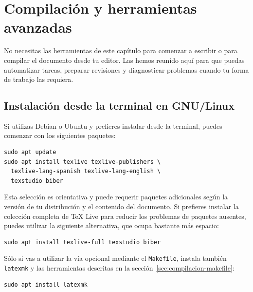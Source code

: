 %

\chapter{Compilación y herramientas avanzadas}
\label{cha:compilacion-avanzada}

No necesitas las herramientas de este capítulo para comenzar a escribir o para compilar el documento desde tu editor. Las hemos reunido aquí para que puedas automatizar tareas, preparar revisiones y diagnosticar problemas cuando tu forma de trabajo las requiera.

\section{Instalación desde la terminal en GNU/Linux}
\label{sec:instalacion-gnu-linux}

Si utilizas Debian o Ubuntu y prefieres instalar desde la terminal, puedes comenzar con los siguientes paquetes:

\begin{verbatim}
sudo apt update
sudo apt install texlive texlive-publishers \
  texlive-lang-spanish texlive-lang-english \
  texstudio biber
\end{verbatim}

Esta selección es orientativa y puede requerir paquetes adicionales según la versión de tu distribución y el contenido del documento. Si prefieres instalar la colección completa de TeX Live para reducir los problemas de paquetes ausentes, puedes utilizar la siguiente alternativa, que ocupa bastante más espacio:

\begin{verbatim}
sudo apt install texlive-full texstudio biber
\end{verbatim}

Sólo si vas a utilizar la vía opcional mediante el \texttt{Makefile}, instala también \texttt{latexmk} y las herramientas descritas en la sección~\ref{sec:compilacion-makefile}:

\begin{verbatim}
sudo apt install latexmk
\end{verbatim}

